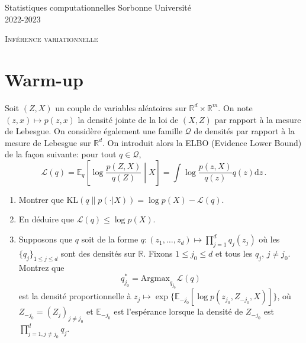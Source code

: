 \documentclass[a4paper,10pt,fleqn]{article}
\newcommand{\rset}{\ensuremath{\mathbb{R}}}
\newcommand{\1}{\ensuremath{\mathbbm{1}}}
\begin{document}
\noindent Statistiques computationnelles \hfill Sorbonne Universit\'e \\
 2022-2023

\noindent\hrulefill

\begin{center}
\textsc{Inf\'erence variationnelle}
\end{center}
\hrulefill

\medskip


\section{Warm-up}
Soit $(Z,X)$ un couple de variables al\'eatoires sur $\rset^d\times \rset^m$. On note $(z,x)\mapsto p(z,x)$ la densit\'e jointe de la loi de $(X,Z)$ par rapport \`a la mesure de Lebesgue. On consid\`ere \'egalement une famille $\mathcal{Q}$ de densit\'es par rapport \`a la mesure de Lebesgue sur $\rset^d$. On introduit alors la ELBO (Evidence Lower Bound) de la fa\c con suivante: pour tout $q\in\mathcal{Q}$,
$$
\mathcal{L}(q) = \mathbb{E}_q\left[\log\frac{p(Z,X)}{q(Z)}\middle | X\right] = \int \log\frac{p(z,X)}{q(z)}q(z) \mathrm{d} z\,.
$$
\begin{enumerate}
\item Montrer que $\mathrm{KL}(q\|p(\cdot|X)) = \log p(X) - \mathcal{L}(q) $.
\item En d\'eduire que $\mathcal{L}(q) \leq \log p(X)$.
\item Supposons que $q$ soit de la forme $q:(z_1,\ldots,z_d)\mapsto \prod_{j=1}^dq_j(z_j)$ o\`u les $\{q_j\}_{1\leq j\leq d}$ sont des densit\'es sur $\rset$. Fixons $1\leq j_0 \leq d$ et tous les $q_j$, $j\neq j_0$. Montrez que 
$$
q_{j_0}^* = \mathrm{Argmax}_{q_{j_0}} \mathcal{L}(q) 
$$
est la densit\'e proportionnelle \`a $z_j \mapsto \exp\{\mathbb{E}_{-j_0}[\log p (z_{j_0},Z_{-j_0},X)]\}$, o\`u $Z_{-j_0} = (Z_j)_{j\neq j_0}$ et $\mathbb{E}_{-j_0}$ est l'esp\'erance lorsque la densit\'e de $Z_{-j_0}$ est $\prod_{j=1,j\neq j_0}^dq_j$.


\end{enumerate}
\end{document}
